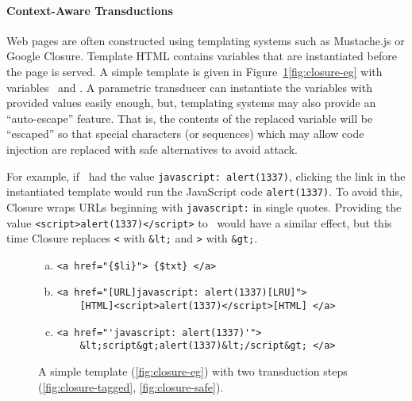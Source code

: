 
\paragraph{Context-Aware Transductions}

Web pages are often constructed using templating systems such as Mustache.js or Google Closure.
Template HTML contains variables that are instantiated before the page is served.
A simple template is given in Figure~\ref{fig:closure}\ref{fig:closure-eg} with variables \linkvar\ and \linktextvar.
A parametric transducer can instantiate the variables with provided values easily enough, but, templating systems may also provide an ``auto-escape'' feature.
That is, the contents of the replaced variable will be ``escaped'' so that special characters (or sequences) which may allow code injection are replaced with safe alternatives to avoid attack.

For example, if \linkvar\ had the value \texttt{javascript: alert(1337)}, clicking the link in the instantiated template would run the JavaScript code \texttt{alert(1337)}.
To avoid this, Closure wraps URLs beginning with \texttt{javascript:} in single quotes.
Providing the value \texttt{<script>alert(1337)</script>} to \linktextvar\ would have a similar effect, but this time Closure replaces \texttt{<} with \texttt{\&lt;} and \texttt{>} with \texttt{\&gt;}.

\begin{figure}
\begin{center}
\begin{minipage}{.75\linewidth}
\begin{enumerate}[(a)]
\item \label{fig:closure-eg}
\begin{verbatim}
<a href="{$li}"> {$txt} </a>
\end{verbatim}
\item \label{fig:closure-tagged}
\begin{verbatim}
<a href="[URL]javascript: alert(1337)[LRU]">
    [HTML]<script>alert(1337)</script>[HTML] </a>
\end{verbatim}
\item \label{fig:closure-safe}
\begin{verbatim}
<a href="'javascript: alert(1337)'">
    &lt;script&gt;alert(1337)&lt;/script&gt; </a>
\end{verbatim}
\end{enumerate}
\end{minipage}
\end{center}
\vspace{-3ex}
\caption{\label{fig:closure}A simple template (\ref{fig:closure-eg}) with two transduction steps (\ref{fig:closure-tagged}, \ref{fig:closure-safe}).}
\end{figure}

